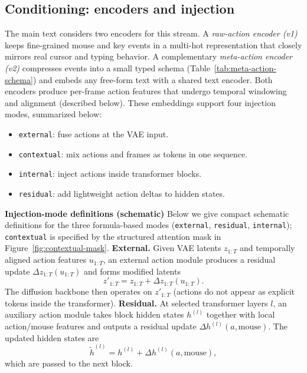 \subsection{Conditioning: encoders and injection}
The main text considers two encoders for this stream.
A \emph{raw-action encoder (v1)} keeps fine-grained mouse and key events in a multi-hot representation that closely mirrors real cursor and typing behavior.
A complementary \emph{meta-action encoder (v2)} compresses events into a small typed schema (Table~\ref{tab:meta-action-schema}) and embeds any free-form text with a shared text encoder.
Both encoders produce per-frame action features that undergo temporal windowing and alignment (described below).
These embeddings support four injection modes, summarized below:
\begin{tcolorbox}[
  colback=apricotglaze!40!white,
  colframe=metablue!40,
  interior style={shade,shading angle=315,left color=white,right color=apricotglaze!55!white},
  boxrule=0pt,
  borderline west={1pt}{0pt}{gray!60},
  left=6pt,right=4pt,top=3pt,bottom=3pt]
\small
\begin{itemize}
  \setlength{\itemsep}{2pt}
  \setlength{\topsep}{2pt}
  \item \texttt{external}: fuse actions at the VAE input.
  \item \texttt{contextual}: mix actions and frames as tokens in one sequence.
  \item \texttt{internal}: inject actions inside transformer blocks.
  \item \texttt{residual}: add lightweight action deltas to hidden states.
\end{itemize}
\end{tcolorbox}

\noindent\textbf{Injection-mode definitions (schematic)}
\label{appendix:gui-injection-equations}
Below we give compact schematic definitions for the three formula-based modes (\texttt{external}, \texttt{residual}, \texttt{internal}); \texttt{contextual} is specified by the structured attention mask in Figure~\ref{fig:contextual-mask}.
\textbf{External.} Given VAE latents $z_{1:T}$ and temporally aligned action features $u_{1:T}$, an external action module produces a residual update $\Delta z_{1:T}(u_{1:T})$ and forms modified latents
\[
  z'_{1:T} = z_{1:T} + \Delta z_{1:T}(u_{1:T}).
\]
The diffusion backbone then operates on $z'_{1:T}$ (actions do not appear as explicit tokens inside the transformer).
\textbf{Residual.} At selected transformer layers $l$, an auxiliary action module takes block hidden states $h^{(l)}$ together with local action/mouse features and outputs a residual update $\Delta h^{(l)}(a,\text{mouse})$.
The updated hidden states are
\[
  \tilde{h}^{(l)} = h^{(l)} + \Delta h^{(l)}(a,\text{mouse}),
\]
which are passed to the next block.

